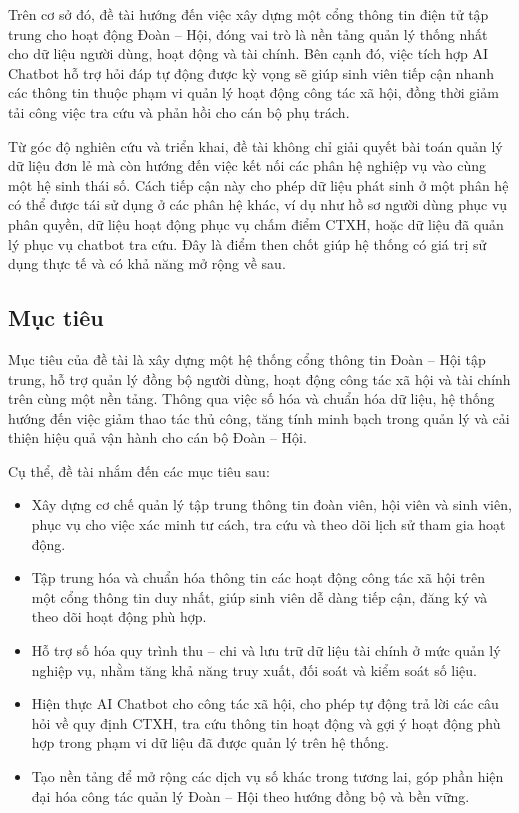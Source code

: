 Trên cơ sở đó, đề tài hướng đến việc xây dựng một cổng thông tin điện tử tập trung cho hoạt động Đoàn -- Hội, đóng vai trò là nền tảng quản lý thống nhất cho dữ liệu người dùng, hoạt động và tài chính. Bên cạnh đó, việc tích hợp AI Chatbot hỗ trợ hỏi đáp tự động được kỳ vọng sẽ giúp sinh viên tiếp cận nhanh các thông tin thuộc phạm vi quản lý hoạt động công tác xã hội, đồng thời giảm tải công việc tra cứu và phản hồi cho cán bộ phụ trách.

Từ góc độ nghiên cứu và triển khai, đề tài không chỉ giải quyết bài toán quản lý dữ liệu đơn lẻ mà còn hướng đến việc kết nối các phân hệ nghiệp vụ vào cùng một hệ sinh thái số. Cách tiếp cận này cho phép dữ liệu phát sinh ở một phân hệ có thể được tái sử dụng ở các phân hệ khác, ví dụ như hồ sơ người dùng phục vụ phân quyền, dữ liệu hoạt động phục vụ chấm điểm CTXH, hoặc dữ liệu đã quản lý phục vụ chatbot tra cứu. Đây là điểm then chốt giúp hệ thống có giá trị sử dụng thực tế và có khả năng mở rộng về sau.

\subsection{Mục tiêu}
Mục tiêu của đề tài là xây dựng một hệ thống cổng thông tin Đoàn -- Hội tập trung, hỗ trợ quản lý đồng bộ người dùng, hoạt động công tác xã hội và tài chính trên cùng một nền tảng. Thông qua việc số hóa và chuẩn hóa dữ liệu, hệ thống hướng đến việc giảm thao tác thủ công, tăng tính minh bạch trong quản lý và cải thiện hiệu quả vận hành cho cán bộ Đoàn -- Hội.

Cụ thể, đề tài nhắm đến các mục tiêu sau:
\begin{itemize}
	\item Xây dựng cơ chế quản lý tập trung thông tin đoàn viên, hội viên và sinh viên, phục vụ cho việc xác minh tư cách, tra cứu và theo dõi lịch sử tham gia hoạt động.
	\item Tập trung hóa và chuẩn hóa thông tin các hoạt động công tác xã hội trên một cổng thông tin duy nhất, giúp sinh viên dễ dàng tiếp cận, đăng ký và theo dõi hoạt động phù hợp.
	\item Hỗ trợ số hóa quy trình thu -- chi và lưu trữ dữ liệu tài chính ở mức quản lý nghiệp vụ, nhằm tăng khả năng truy xuất, đối soát và kiểm soát số liệu.
	\item Hiện thực AI Chatbot cho công tác xã hội, cho phép tự động trả lời các câu hỏi về quy định CTXH, tra cứu thông tin hoạt động và gợi ý hoạt động phù hợp trong phạm vi dữ liệu đã được quản lý trên hệ thống.
	\item Tạo nền tảng để mở rộng các dịch vụ số khác trong tương lai, góp phần hiện đại hóa công tác quản lý Đoàn -- Hội theo hướng đồng bộ và bền vững.
\end{itemize}

